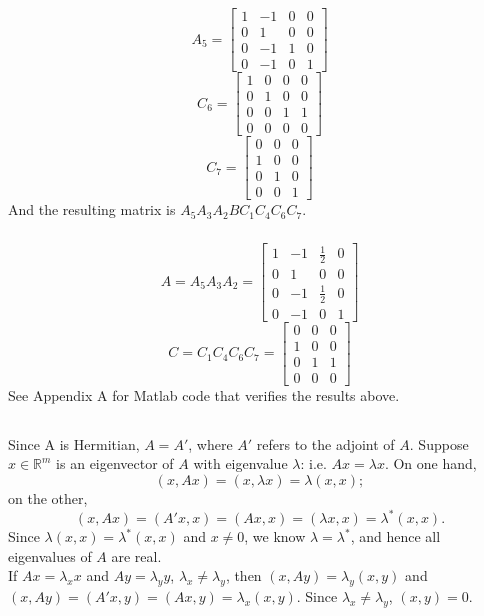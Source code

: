 \documentclass[11pt]{article}
\begin{document}
$$A_5=\begin{bmatrix} 1&-1&0&0\\0&1&0&0\\0&-1&1&0\\0&-1&0&1\end{bmatrix} $$
$$C_6=\begin{bmatrix} 1&0&0&0\\0&1&0&0\\0&0&1&1\\0&0&0&0\end{bmatrix}$$
$$C_7=\begin{bmatrix} 0&0&0\\1&0&0\\0&1&0\\0&0&1\end{bmatrix} $$
And the resulting matrix is $A_5A_3A_2BC_1C_4C_6C_7$. 
\subsubsection{}
$$A=A_5A_3A_2=\begin{bmatrix} 1&-1&\frac12&0\\0&1&0&0\\0&-1&\frac12&0\\0&-1&0&1\end{bmatrix} $$
$$C=C_1C_4C_6C_7=\begin{bmatrix} 0&0&0\\1&0&0\\0&1&1\\0&0&0\end{bmatrix} $$
See Appendix A for Matlab code that verifies the results above.
\subsection{}
Since A is Hermitian, $A=A'$, where $A'$ refers to the adjoint of $A$. Suppose $x\in\mathbb{R}^m$ is an eigenvector of $A$ with eigenvalue $\lambda$: i.e. $Ax=\lambda x$. On one hand, $$(x,Ax)=(x, \lambda x) = \lambda(x,x);$$ on the other, $$(x,Ax)=(A'x, x)=(Ax,x)=(\lambda x,x)=\lambda^*(x,x).$$ Since $\lambda(x,x)=\lambda^*(x,x)$ and $x\neq0$, we know $\lambda=\lambda^*$, and hence all eigenvalues of $A$ are real.  \\[0.5cm]
If $Ax=\lambda_xx$ and $Ay=\lambda_yy$, $\lambda_x\neq\lambda_y$, then $(x,Ay) = \lambda_y(x,y)$ and $(x,Ay)=(A'x,y)=(Ax,y)=\lambda_x(x,y)$. Since $\lambda_x\neq\lambda_y$, $(x,y)=0$. 
\section{}
\end{document}
